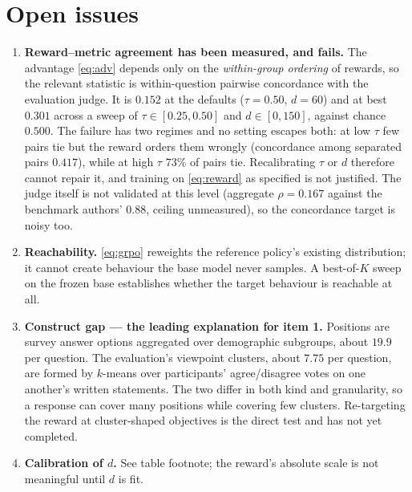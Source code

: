 \documentclass[11pt]{article}
\begin{document}
\section*{Open issues}

\begin{enumerate}
\item \textbf{Reward--metric agreement has been measured, and fails.} The
advantage \eqref{eq:adv} depends only on the \emph{within-group ordering} of
rewards, so the relevant statistic is within-question pairwise concordance with
the evaluation judge. It is $0.152$ at the defaults ($\tau = 0.50$, $d = 60$)
and at best $0.301$ across a sweep of $\tau \in [0.25, 0.50]$ and
$d \in [0, 150]$, against chance $0.500$. The failure has two regimes and no
setting escapes both: at low $\tau$ few pairs tie but the reward orders them
wrongly (concordance among separated pairs $0.417$), while at high $\tau$ $73\%$
of pairs tie. Recalibrating $\tau$ or $d$ therefore cannot repair it, and
training on \eqref{eq:reward} as specified is not justified. The judge itself is
not validated at this level (aggregate $\rho = 0.167$ against the benchmark
authors' $0.88$, ceiling unmeasured), so the concordance target is noisy too.
\item \textbf{Reachability.} \eqref{eq:grpo} reweights the reference policy's
existing distribution; it cannot create behaviour the base model never samples.
A best-of-$K$ sweep on the frozen base establishes whether the target behaviour
is reachable at all.
\item \textbf{Construct gap --- the leading explanation for item 1.} Positions
are survey answer options aggregated over demographic subgroups, about $19.9$ per
question. The evaluation's viewpoint clusters, about $7.75$ per question, are
formed by $k$-means over participants' agree/disagree votes on one another's
written statements. The two differ in both kind and granularity, so a response
can cover many positions while covering few clusters. Re-targeting the reward at
cluster-shaped objectives is the direct test and has not yet completed.
\item \textbf{Calibration of $d$.} See table footnote; the reward's absolute
scale is not meaningful until $d$ is fit.
\end{enumerate}
\end{document}
